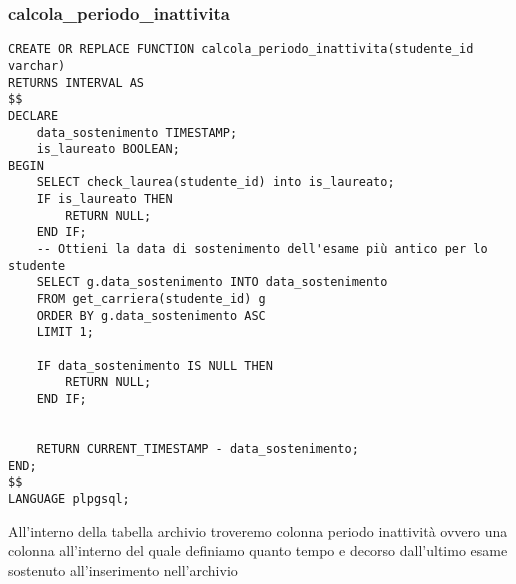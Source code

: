\subsubsection{calcola\_periodo\_inattivita}\label{calcolaPeriodoInattivita}
\begin{lstlisting}[style=sqlStyle]
CREATE OR REPLACE FUNCTION calcola_periodo_inattivita(studente_id varchar)
RETURNS INTERVAL AS
$$
DECLARE
    data_sostenimento TIMESTAMP;
    is_laureato BOOLEAN;
BEGIN
    SELECT check_laurea(studente_id) into is_laureato;
    IF is_laureato THEN
        RETURN NULL;
    END IF; 
    -- Ottieni la data di sostenimento dell'esame più antico per lo studente
    SELECT g.data_sostenimento INTO data_sostenimento
    FROM get_carriera(studente_id) g
    ORDER BY g.data_sostenimento ASC
    LIMIT 1;

    IF data_sostenimento IS NULL THEN
        RETURN NULL;
    END IF;
    

    RETURN CURRENT_TIMESTAMP - data_sostenimento;
END;
$$
LANGUAGE plpgsql;

\end{lstlisting}
All'interno della tabella archivio   troveremo colonna periodo inattività  ovvero una colonna all'interno del quale definiamo quanto tempo e decorso dall'ultimo esame sostenuto all'inserimento nell'archivio